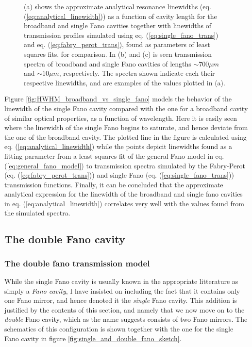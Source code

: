 \begin{figure}[h!]
\begin{subfigure}[c]{0.34\textwidth}
        \caption{}
        \label{fig:10um_broadband_and_single_fano_peak}
    \end{subfigure}
    \caption{(a) shows the approximate analytical resonance linewidths (eq. (\ref{eq:analytical_linewidth})) as a function of cavity length for the broadband and single Fano cavities together with linewidths of transmission profiles simulated using eq. (\ref{eq:single_fano_trans}) and eq. (\ref{eq:fabry_perot_trans}), found as parameters of least squares fits, for comparison. In (b) and (c) is seen transmission spectra of broadband and single Fano cavities of lengths $\sim 700 \mu m$ and $\sim 10 \mu m$, respectively. The spectra shown indicate each their respective linewidths, and are examples of the values plotted in (a).}
\end{figure}

Figure \ref{fig:HWHM_broadband_vs_single_fano} models the behavior of the linewidth of the single Fano cavity compared with the one for a broadband cavity of similar optical properties, as a function of wavelength. Here it is easily seen where the linewidth of the single Fano begins to saturate, and hence deviate from the one of the broadband cavity. The plotted line in the figure is calculated using eq. (\ref{eq:analytical_linewidth}) while the points depicit linewidths found as a fitting parameter from a least squares fit of the general Fano model in eq. (\ref{eq:general_fano_model}) to transmission spectra simulated by the Fabry-Perot (eq. (\ref{eq:fabry_perot_trans})) and single Fano (eq. (\ref{eq:single_fano_trans})) transmission functions. Finally, it can be concluded that the approximate analytical expression for the linewidth of the broadband and single fano cavities in eq. (\ref{eq:analytical_linewidth}) correlates very well with the values found from the simulated spectra.

\subsection{The double Fano cavity}

\subsubsection{The double fano transmission model}

While the single Fano cavity is usually known in the appropriate litterature as simply a \emph{Fano cavity}, I have insisted on including the fact that it contains only one Fano mirror, and hence denoted it the \emph{single} Fano cavity. This addition is justified by the contents of this section, and namely that we now move on to the \emph{double} Fano cavity, which as the name suggests consists of two Fano mirrors. The schematics of this configuration is shown together with the one for the single Fano cavity in figure \ref{fig:single_and_double_fano_sketch}.

